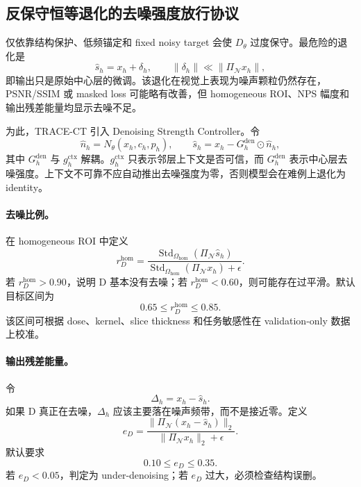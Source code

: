 \documentclass[11pt,a4paper,UTF8,fontset=fandol]{ctexart}
\theoremstyle{definition}
\DeclareMathOperator{\Std}{Std}
\begin{document}
\subsection{反保守恒等退化的去噪强度放行协议}
\label{subsec:denoising-strength-release}

仅依靠结构保护、低频锚定和 fixed noisy target 会使 $D_\theta$ 过度保守。最危险的退化是
\begin{equation}
    \hat s_h=x_h+\delta_h,
    \qquad
    \|\delta_h\|\ll \|\Pi_{\mathcal N}x_h\|,
\end{equation}
即输出只是原始中心层的微调。该退化在视觉上表现为噪声颗粒仍然存在，PSNR/SSIM 或 masked loss 可能略有改善，但 homogeneous ROI、NPS 幅度和输出残差能量均显示去噪不足。

为此，TRACE-CT 引入 Denoising Strength Controller。令
\begin{equation}
    \hat n_h=N_\theta(x_h,c_h,p_h),
    \qquad
    \hat s_h=x_h-G_h^{\mathrm{den}}\odot \hat n_h,
\end{equation}
其中 $G_h^{\mathrm{den}}$ 与 $g_h^{\mathrm{ctx}}$ 解耦。$g_h^{\mathrm{ctx}}$ 只表示邻层上下文是否可信，而 $G_h^{\mathrm{den}}$ 表示中心层去噪强度。上下文不可靠不应自动推出去噪强度为零，否则模型会在难例上退化为 identity。

\paragraph{去噪比例。}
在 homogeneous ROI 中定义
\begin{equation}
    r_D^{\mathrm{hom}}
    =\frac{\Std_{\Omega_{\mathrm{hom}}}(\Pi_{\mathcal N}\hat s_h)}
    {\Std_{\Omega_{\mathrm{hom}}}(\Pi_{\mathcal N}x_h)+\epsilon}.
\end{equation}
若 $r_D^{\mathrm{hom}}>0.90$，说明 D 基本没有去噪；若 $r_D^{\mathrm{hom}}<0.60$，则可能存在过平滑。默认目标区间为
\begin{equation}
    0.65\le r_D^{\mathrm{hom}}\le 0.85.
\end{equation}
该区间可根据 dose、kernel、slice thickness 和任务敏感性在 validation-only 数据上校准。

\paragraph{输出残差能量。}
令
\begin{equation}
    \Delta_h=x_h-\hat s_h.
\end{equation}
如果 D 真正在去噪，$\Delta_h$ 应该主要落在噪声频带，而不是接近零。定义
\begin{equation}
    e_D=
    \frac{\|\Pi_{\mathcal N}(x_h-\hat s_h)\|_2}
    {\|\Pi_{\mathcal N}x_h\|_2+\epsilon}.
\end{equation}
默认要求
\begin{equation}
    0.10\le e_D\le 0.35.
\end{equation}
若 $e_D<0.05$，判定为 under-denoising；若 $e_D$ 过大，必须检查结构误删。
\end{document}
